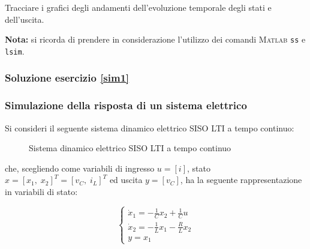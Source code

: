 \documentclass[../main.tex]{subfiles}
\begin{document}
Tracciare i grafici degli andamenti dell'evoluzione temporale degli stati e dell'uscita.

\textbf{Nota:} si ricorda di prendere in considerazione l'utilizzo dei comandi \textsc{Matlab} \texttt{ss} e \texttt{lsim}.

 
\subsubsection*{Soluzione esercizio \ref{sim1}}


\vspace*{1cm}
\subsubsection{Simulazione della risposta di un sistema elettrico}
\label{sim2}

Si consideri il seguente sistema dinamico elettrico SISO LTI a tempo continuo:

\begin{figure}[h]
\begin{center}
	
	
\caption{Sistema dinamico elettrico SISO LTI a tempo continuo}
\label{fig:E102}
	
\end{center}	
\end{figure}

che, scegliendo come variabili di ingresso $u = [i]$, stato $x = [x_1,\; x_2]^T = [v_C,\; i_L]^T$ ed uscita $y = [v_C]$, ha la seguente rappresentazione in variabili di stato:

\begin{equation}
\begin{cases}
	\dot x_1 = - \frac{1}{C} x_2 + \frac{1}{C} u \\
	\dot x_2 = - \frac{1}{L} x_1 - \frac{R}{L} x_2 \\
	y = x_1
\end{cases}	
\end{equation}
\end{document}
